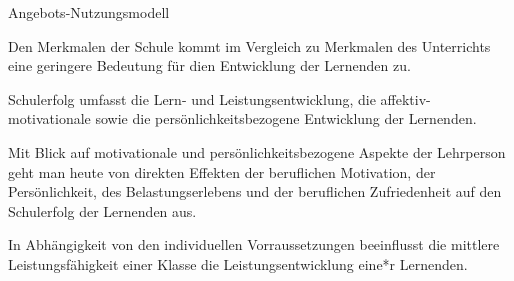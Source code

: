 \begin{multiple-choice}{Angebots-Nutzungsmodell}
    \begin{answers}
        \item[\correct] Den Merkmalen der Schule kommt im Vergleich zu Merkmalen des Unterrichts eine geringere Bedeutung für dien Entwicklung der Lernenden zu.
        \item[\correct] Schulerfolg umfasst die Lern- und Leistungsentwicklung, die affektiv- motivationale sowie die persönlichkeitsbezogene Entwicklung der Lernenden.
        \item[\wrong] Mit Blick auf motivationale und persönlichkeitsbezogene Aspekte der Lehrperson geht man heute von direkten Effekten der beruflichen Motivation, der Persönlichkeit, des Belastungserlebens und der beruflichen Zufriedenheit auf den Schulerfolg der Lernenden aus.
        \item[\wrong] In Abhängigkeit von den individuellen Vorraussetzungen beeinflusst die mittlere Leistungsfähigkeit einer Klasse die Leistungsentwicklung eine*r Lernenden.
    \end{answers}
\end{multiple-choice}

